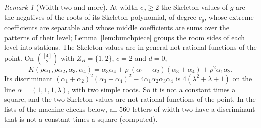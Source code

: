 \documentclass[11pt]{article}
\theoremstyle{plain}
\theoremstyle{definition}
\theoremstyle{remark}
\newtheorem{rem}[prop]{Remark}
\begin{document}
\begin{rem}[Width two and more]\label{rem:widthtwo}
At width $c_g\ge2$ the Skeleton values of $g$ are the negatives of the roots of its Skeleton polynomial, of degree $c_g$, whose extreme coefficients are separable and whose middle coefficients are sums over the patterns of their level; Lemma~\ref{lem:bunchpiece} groups the room sides of each level into stations. The Skeleton values are in general not rational functions of the point. On $\binom{[4]}2$ with $Z_B=\{1,2\}$, $c=2$ and $d=0$,
\[
K(\rho\alpha_1,\rho\alpha_2,\alpha_3,\alpha_4)=\alpha_3\alpha_4+\rho\,(\alpha_1+\alpha_2)(\alpha_3+\alpha_4)+\rho^2\alpha_1\alpha_2 .
\]
Its discriminant $(\alpha_1+\alpha_2)^2(\alpha_3+\alpha_4)^2-4\alpha_1\alpha_2\alpha_3\alpha_4$ is $4(\lambda^2+\lambda+1)$ on the line $\alpha=(1,1,1,\lambda)$, with two simple roots. So it is not a constant times a square, and the two Skeleton values are not rational functions of the point. In the lists of the machine checks below, all $560$ letters of width two have a discriminant that is not a constant times a square (computed).
\end{rem}
\end{document}
